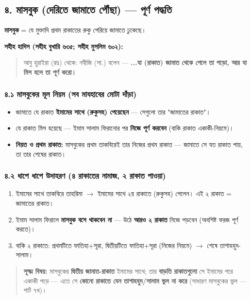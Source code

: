 \subsection*{৪. মাসবুক (দেরিতে জামাতে পৌঁছা) — পূর্ণ পদ্ধতি}

\textbf{মাসবুক} = যে মুক্তাদি প্রথম রাকাতের রুকু পেরিয়ে জামাতে ঢুকেছে।

\textbf{সহীহ হাদিস (সহীহ বুখারি ৬৩৫; সহীহ মুসলিম ৬০২):}

\begin{quote}
আবু হুরাইরা (রাঃ) থেকে: নবীজি (সা.) বলেন — \textbf{...যা (রাকাত) জামাত থেকে পেলে তা পড়ো, আর যা মিস হলে তা পূর্ণ করো।}
\end{quote}

\subsubsection*{৪.১ মাসবুকের মূল নিয়ম (সব মাযহাবের মোটা দাঁড়া)}

\begin{itemize}
\item জামাতে যে রাকাত \textbf{ইমামের সাথে (রুকুসহ) পেয়েছেন} — সেগুলো তার "জামাতের রাকাত"।
\item যে রাকাত মিস হয়েছে — ইমাম সালাম ফিরানোর পর \textbf{নিজে পূর্ণ করবেন} (বাকি রাকাত একাকী-নিয়মে)।
\item \textbf{নিয়ত ও প্রথম রাকাত:} মাসবুকের প্রথম তাকবিরেই তার নিজের প্রথম রাকাত — জামাতে সে যত রাকাত পায়, তা তার শেষের রাকাত।
\end{itemize}
\subsubsection*{৪.২ ধাপে ধাপে উদাহরণ (৪ রাকাতের নামাজ, ২ রাকাত পাওয়া)}

\begin{enumerate}
\item ইমামের সাথে তাকবিরে তাহরিমা $\rightarrow$ ইমামের সাথে ২য় রাকাতে (রুকুসহ) পেলেন। এই ২ রাকাত = জামাতের রাকাত।
\item ইমাম সালাম ফিরালে \textbf{মাসবুক বসে থাকবেন না} — উঠে \textbf{আরও ২ রাকাত} নিজে পড়বেন (অবশিষ্ট ফরজ পূর্ণ করতে)।
\item বাকি ২ রাকাতে: প্রথমটিতে ফাতিহা+সূরা, দ্বিতীয়টিতে ফাতিহা+সূরা (নিজের নিয়মে) $\rightarrow$ শেষে তাশাহহুদ-সালাম।
\end{enumerate}
\begin{quote}
\textbf{সূক্ষ্ম বিষয়:} মাসবুকের \textbf{দ্বিতীয় জামাত-রাকাত} ইমামের সাথে; তার \textbf{বাড়তি রাকাতগুলো} সে ইমামের পরে একাকী পড়ে — এতে সে \textbf{কোনো রাকাতে যেন তাশাহহুদ/সালাম ভুল না করে} (সাধারণ মাসবুকের ভুল — পার্ট ৭খ)।
\end{quote}

